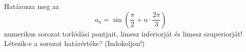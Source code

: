 \documentclass[11pt]{scrartcl}
\begin{document}
Határozza meg az
\[
	a_n = \sin\left(\frac{\pi}{2} + n \cdot \frac{2\pi}{3}\right)
\]
numerikus sorozat torlódási pontjait, limesz inferiorját és limesz
szuperiorját! Létezik-e a sorozat határértéke? (Indokoljon!)
\end{document}
